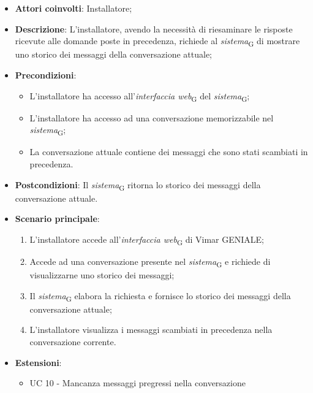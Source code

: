 \begin{itemize}
    \item \textbf{Attori coinvolti}: Installatore;
    \item \textbf{Descrizione}: L’installatore, avendo la necessità di riesaminare le risposte ricevute alle domande poste in precedenza, richiede al \textit{sistema}\textsubscript{G} di mostrare uno storico dei messaggi della conversazione attuale;
    \item \textbf{Precondizioni}: 
        \begin{itemize}
            \item L’installatore ha accesso all’\textit{interfaccia web}\textsubscript{G} del \textit{sistema}\textsubscript{G};
            \item L’installatore ha accesso ad una conversazione memorizzabile nel \textit{sistema}\textsubscript{G};
            \item La conversazione attuale contiene dei messaggi che sono stati scambiati in precedenza.
        \end{itemize}
    \item \textbf{Postcondizioni}: Il \textit{sistema}\textsubscript{G} ritorna lo storico dei messaggi della conversazione attuale.
    \item \textbf{Scenario principale}:
    \begin{enumerate}
    \item L’installatore accede all’\textit{interfaccia web}\textsubscript{G} di Vimar GENIALE;
    \item Accede ad una conversazione presente nel \textit{sistema}\textsubscript{G} e richiede di visualizzarne uno storico dei messaggi;
    \item Il \textit{sistema}\textsubscript{G} elabora la richiesta e fornisce lo storico dei messaggi della conversazione attuale;
    \item L’installatore visualizza i messaggi scambiati in precedenza nella conversazione corrente.
    \end{enumerate}
    \item \textbf{Estensioni}: 
        \begin{itemize}
            \item UC 10 - Mancanza messaggi pregressi nella conversazione
        \end{itemize}
\end{itemize}
